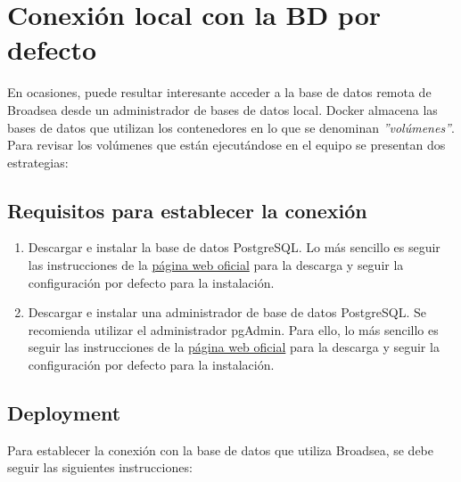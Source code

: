 \chapter{Conexión local con la BD por defecto} \label{cap:03ConexLocal}

En ocasiones, puede resultar interesante acceder a la base de datos remota de Broadsea desde un administrador de bases de datos local.  Docker almacena las bases de datos que utilizan los contenedores en lo que se denominan \textit{''volúmenes''}. Para revisar los volúmenes que están ejecutándose en el equipo se presentan dos estrategias:

\section{Requisitos para establecer la conexión}

\begin{enumerate}

    \item Descargar e instalar la base de datos PostgreSQL. Lo más sencillo es seguir las instrucciones de la \href{https://www.postgresql.org/download/}{página web oficial} para la descarga y seguir la configuración por defecto para la instalación.

    \item Descargar e instalar una administrador de base de datos PostgreSQL. Se recomienda utilizar el administrador pgAdmin. Para ello, lo más sencillo es seguir las instrucciones de la \href{https://www.pgadmin.org/download/}{página web oficial} para la descarga y seguir la configuración por defecto para la instalación.
    
\end{enumerate}


\section{Deployment}

Para establecer la conexión con la base de datos que utiliza Broadsea, se debe seguir las siguientes instrucciones:

